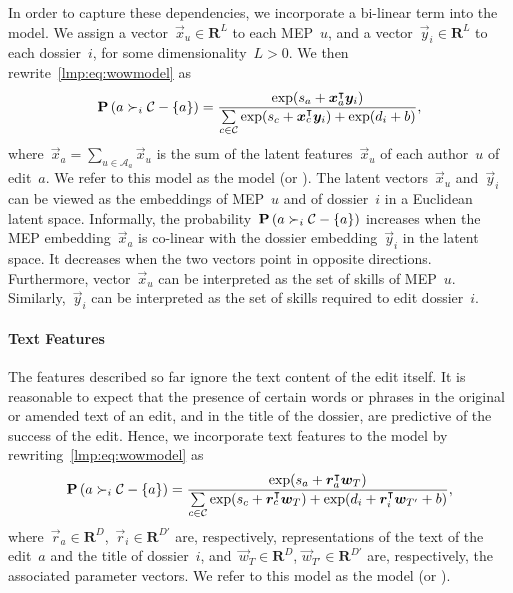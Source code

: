 In order to capture these dependencies, we incorporate a bi-linear term into the \wow{} model.
We assign a vector~$\vec{x}_u \in \mathbf{R}^L$ to each MEP~$u$, and a vector~$\vec{y}_i \in \mathbf{R}^L$ to each dossier~$i$, for some dimensionality~$L > 0$.
We then rewrite~\eqref{lmp:eq:wowmodel} as
\begin{equation}
	\label{lmp:eq:wowlatent}
	\mathbf{P}\left(  a \succ_i \mathcal{C} - \{ a\}  \right) =
	\frac{\exp( s_a + \boldsymbol{x}_a^\intercal \boldsymbol{y}_i) }{ \sum\limits_{c \in \mathcal{C} } \exp(s_c + \boldsymbol{x}_c^\intercal \boldsymbol{y}_i) + \exp(d_i + b) },
\end{equation}
where~$\vec{x}_a = \sum_{u \in \mathcal{A}_a} \vec{x}_u$ is the sum of the latent features~$\vec{x}_u$ of each author~$u$ of edit~$a$.
We refer to this model as the  model (or ).
The latent vectors~$\vec{x}_u$ and~$\vec{y}_i$ can be viewed as the embeddings of MEP~$u$ and of dossier~$i$ in a Euclidean latent space.
Informally, the probability~$\mathbf{P}\left(  a \succ_i \mathcal{C} - \{ a\}  \right)$ increases when the MEP embedding~$ \vec{x}_a$ is co-linear with the dossier embedding~$ \vec{y}_i$ in the latent space.
It decreases when the two vectors point in opposite directions.
Furthermore, vector~$ \vec{x}_u$ can be interpreted as the set of skills of MEP~$u$.
Similarly,~$ \vec{y}_i$ can be interpreted as the set of skills required to edit dossier~$i$.

\paragraph{Text Features}

The features described so far ignore the text content of the edit itself.
It is reasonable to expect that the presence of certain words or phrases in the original or amended text of an edit, and in the title of the dossier, are predictive of the success of the edit.
Hence, we incorporate text features to the \wow{} model by rewriting~\eqref{lmp:eq:wowmodel} as
\begin{equation}
	\label{lmp:eq:wowtext}
	\mathbf{P}\left(  a \succ_i \mathcal{C} - \{ a\}  \right) =\frac{\exp(s_a + \boldsymbol{r}_a ^\intercal \boldsymbol{w}_T  ) }{ \sum\limits_{c \in \mathcal{C} } \exp(s_c + \boldsymbol{r}_c^\intercal \boldsymbol{w}_T) + \exp(d_i + \boldsymbol{r}_i ^\intercal \boldsymbol{w}_{T'} + b) },
\end{equation}
where~$\vec{r}_a\in \mathbf{R}^{D}$,~$\vec{r}_i \in \mathbf{R}^{D'}$  are, respectively, representations of the text of the edit~$a$ and the title of dossier~$i$, and~$\vec{w}_T  \in \mathbf{R}^{D}$, $\vec{w}_{T'}  \in \mathbf{R}^{D'}$ are, respectively, the associated parameter vectors.
We refer to this model as the  model (or ).

